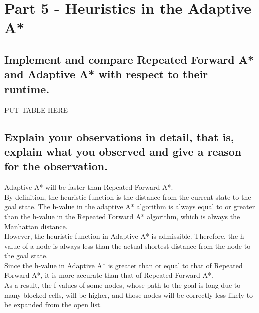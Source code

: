 \documentclass{article}
\begin{document}
\begin{itemize}
\end{itemize}





\section{Part 5 - Heuristics in the Adaptive A*}

\subsection{ Implement and compare Repeated Forward A* and Adaptive A* with respect to their runtime.}

PUT TABLE HERE

\subsection{Explain your observations in detail, that is, explain what you observed and give a reason for the observation.}
Adaptive A* will be faster than Repeated Forward A*. \\

By definition, the heuristic function is the distance from the current state to the goal state. The h-value in the adaptive A* algorithm is always equal to or greater than the h-value in the Repeated Forward A* algorithm, which is always the Manhattan distance.  \\

However, the heuristic function in Adaptive A* is admissible. Therefore, the h-value of a node is always less than the actual shortest distance from the node to the goal state.\\

Since the h-value in Adaptive A* is greater than or equal to that of Repeated Forward A*, it is more accurate than that of Repeated Forward A*. \\

As a result, the f-values of some nodes, whose path to the goal is long due to many blocked cells, will be higher, and those nodes will be correctly less likely to be expanded from the open list.\\


\end{document}
